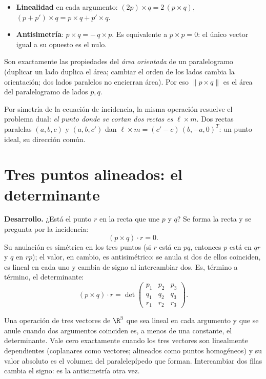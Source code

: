 \begin{resultado}
\begin{itemize}
  \item \textbf{Linealidad} en cada argumento: \((2p)\times q=2\,(p\times q)\),
  \((p+p')\times q=p\times q+p'\times q\).
  \item \textbf{Antisimetría}: \(p\times q=-\,q\times p\). Es equivalente a \(p\times p=0\):
  el único vector igual a su opuesto es el nulo.
\end{itemize}
Son exactamente las propiedades del \emph{área orientada} de un paralelogramo (duplicar un
lado duplica el área; cambiar el orden de los lados cambia la orientación; dos lados
paralelos no encierran área). Por eso \(\lVert p\times q\rVert\) es el área del paralelogramo
de lados \(p,q\).
\end{resultado}

Por simetría de la ecuación de incidencia, la misma operación resuelve el problema dual:
\emph{el punto donde se cortan dos rectas es} \(\ell\times m\). Dos rectas paralelas
\((a,b,c)\) y \((a,b,c')\) dan \(\ell\times m=(c'-c)\,(b,-a,0)^T\): un punto ideal, su
dirección común.

\section{Tres puntos alineados: el determinante}\label{sec:determinante}

{\small\vspace{1mm}\par}


\textbf{Desarrollo.} ¿Está el punto \(r\) en la recta que une \(p\) y \(q\)? Se forma la
recta y se pregunta por la incidencia:
\[
  (p\times q)\cdot r=0 .
\]
Su anulación es simétrica en los tres puntos (si \(r\) está en \(pq\), entonces \(p\) está
en \(qr\) y \(q\) en \(rp\)); el valor, en cambio, es antisimétrico: se anula si dos de
ellos coinciden, es lineal en cada uno y cambia de signo al intercambiar dos. Es, término a término, el determinante:
\[
  (p\times q)\cdot r=\det\begin{pmatrix}p_1&p_2&p_3\\q_1&q_2&q_3\\r_1&r_2&r_3\end{pmatrix}.
\]

\begin{resultado}
Una operación de tres vectores de \(\R^3\) que sea lineal en cada argumento y que se anule
cuando dos argumentos coinciden es, a menos de una constante, el determinante. Vale cero
exactamente cuando los tres vectores son linealmente dependientes (coplanares como vectores;
alineados como puntos homogéneos) y su valor absoluto es el volumen del paralelepípedo que
forman. Intercambiar dos filas cambia el signo: es la antisimetría otra vez.
\end{resultado}

